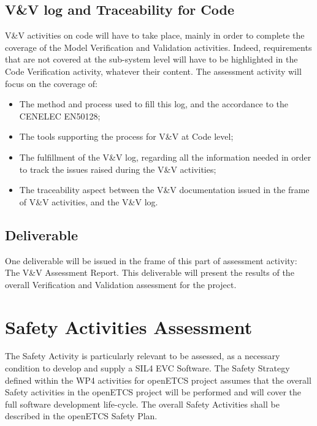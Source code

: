 \documentclass[openetcs]{template/openetcs_article}
\begin{document}
\subsection{V\&V log and Traceability for Code}
V\&V activities on code will have to take place, mainly in order to complete the coverage of the Model Verification and Validation activities. Indeed,
requirements that are not covered at the sub-system level will have to be highlighted in the Code Verification activity, whatever their content.
The assessment activity will focus on the coverage of:
\begin{itemize}
\item The method and process used to fill this log, and the accordance to the CENELEC EN50128;
\item The tools supporting the process for V\&V at Code level;
\item The fulfillment of the V\&V log, regarding all the information needed in order to track the issues raised during the V\&V activities;
\item The traceability aspect between the V\&V documentation issued in the frame of V\&V activities, and the V\&V log.
\end{itemize}

\subsection{Deliverable}
One deliverable will be issued in the frame of this part of assessment activity: The V\&V Assessment Report. This deliverable will present the results
of the overall Verification and Validation assessment for the project.

\section{Safety Activities Assessment}
The Safety Activity is particularly relevant to be assessed, as a necessary condition to develop and supply a SIL4 EVC Software. The Safety Strategy defined
within the WP4 activities for openETCS project assumes that the overall Safety activities in the openETCS project will be performed and will cover the full software development life-cycle.
The overall Safety Activities shall be described in the openETCS Safety Plan.
\end{document}
